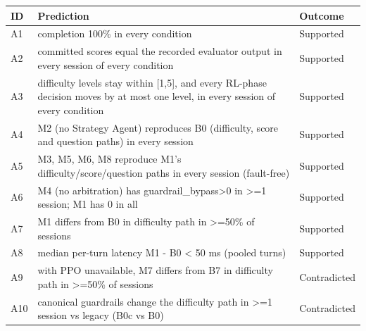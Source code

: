 \begin{tabular}{lp{7.6cm}l}
\toprule
ID & Prediction & Outcome\\
\midrule
A1 & completion 100\% in every condition & Supported \\
A2 & committed scores equal the recorded evaluator output in every session of every condition & Supported \\
A3 & difficulty levels stay within [1,5], and every RL-phase decision moves by at most one level, in every session of every condition & Supported \\
A4 & M2 (no Strategy Agent) reproduces B0 (difficulty, score and question paths) in every session & Supported \\
A5 & M3, M5, M6, M8 reproduce M1's difficulty/score/question paths in every session (fault-free) & Supported \\
A6 & M4 (no arbitration) has guardrail\_bypass>0 in >=1 session; M1 has 0 in all & Supported \\
A7 & M1 differs from B0 in difficulty path in >=50\% of sessions & Supported \\
A8 & median per-turn latency M1 - B0 < 50 ms (pooled turns) & Supported \\
A9 & with PPO unavailable, M7 differs from B7 in difficulty path in >=50\% of sessions & Contradicted \\
A10 & canonical guardrails change the difficulty path in >=1 session vs legacy (B0c vs B0) & Contradicted \\
\bottomrule
\end{tabular}
